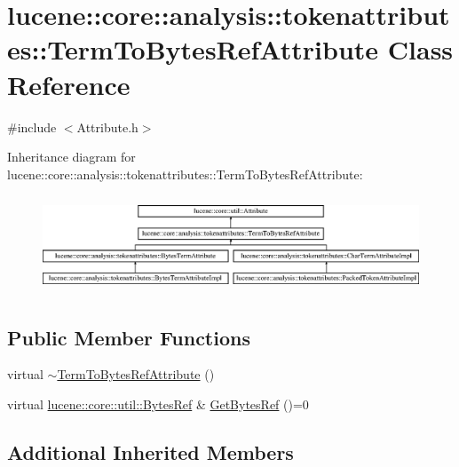 \hypertarget{classlucene_1_1core_1_1analysis_1_1tokenattributes_1_1TermToBytesRefAttribute}{}\section{lucene\+:\+:core\+:\+:analysis\+:\+:tokenattributes\+:\+:Term\+To\+Bytes\+Ref\+Attribute Class Reference}
\label{classlucene_1_1core_1_1analysis_1_1tokenattributes_1_1TermToBytesRefAttribute}


{\ttfamily \#include $<$Attribute.\+h$>$}

Inheritance diagram for lucene\+:\+:core\+:\+:analysis\+:\+:tokenattributes\+:\+:Term\+To\+Bytes\+Ref\+Attribute\+:\begin{figure}[H]
\begin{center}
\leavevmode
\includegraphics[height=2.947368cm]{classlucene_1_1core_1_1analysis_1_1tokenattributes_1_1TermToBytesRefAttribute}
\end{center}
\end{figure}
\subsection*{Public Member Functions}
\begin{DoxyCompactItemize}
\item 
virtual \mbox{\hyperlink{classlucene_1_1core_1_1analysis_1_1tokenattributes_1_1TermToBytesRefAttribute_aab93d48839ca4330486de269d85d43d7}{$\sim$\+Term\+To\+Bytes\+Ref\+Attribute}} ()
\item 
virtual \mbox{\hyperlink{classlucene_1_1core_1_1util_1_1BytesRef}{lucene\+::core\+::util\+::\+Bytes\+Ref}} \& \mbox{\hyperlink{classlucene_1_1core_1_1analysis_1_1tokenattributes_1_1TermToBytesRefAttribute_a8ae9e4cfc1b97185f8151f3eac76a20d}{Get\+Bytes\+Ref}} ()=0
\end{DoxyCompactItemize}
\subsection*{Additional Inherited Members}


